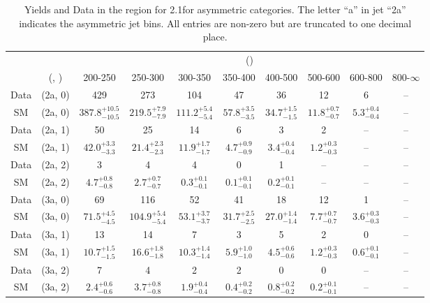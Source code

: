 \begin{table}[h!]
\tiny
\centering
\caption{Yields and Data in the \mmj region for 2.1\ifb for asymmetric categories. The letter ``a'' in jet \eg ``2a''  indicates the asymmetric jet bins. All entries are non-zero but are truncated to one decimal place.\label{tab:yieldsall_mumu_comb_asym}}
\begin{tabular}
{cccccccccc}
	\hline\hline
	&	& \multicolumn{8}{c}{\scalht (\gev)}\\ 
	&	 (\njet, \nb) & 200-250 & 250-300 & 300-350 & 350-400 & 400-500 & 500-600 & 600-800 & 800-$\infty$ \\ [0.8ex] 
\hline
	Data & (2a, 0) & 429 & 273 & 104 & 47 & 36 & 12 & 6 & -- \\[0.5ex] 
	SM & (2a, 0) & $387.8^{+ 10.5 }_{- 10.5 }$ & $219.5^{+ 7.9 }_{- 7.9 }$ & $111.2^{+ 5.4 }_{- 5.4 }$ & $57.8^{+ 3.5 }_{- 3.5 }$ & $34.7^{+ 1.5 }_{- 1.5 }$ & $11.8^{+ 0.7 }_{- 0.7 }$ & $5.3^{+ 0.4 }_{- 0.4 }$ & -- \\[0.5ex] 
	Data & (2a, 1) & 50 & 25 & 14 & 6 & 3 & 2 & -- & -- \\[0.5ex] 
	SM & (2a, 1) & $42.0^{+ 3.3 }_{- 3.3 }$ & $21.4^{+ 2.3 }_{- 2.3 }$ & $11.9^{+ 1.7 }_{- 1.7 }$ & $4.7^{+ 0.9 }_{- 0.9 }$ & $3.4^{+ 0.4 }_{- 0.4 }$ & $1.2^{+ 0.3 }_{- 0.3 }$ & -- & -- \\[0.5ex] 
	Data & (2a, 2) & 3 & 4 & 4 & 0 & 1 & -- & -- & -- \\[0.5ex] 
	SM & (2a, 2) & $4.7^{+ 0.8 }_{- 0.8 }$ & $2.7^{+ 0.7 }_{- 0.7 }$ & $0.3^{+ 0.1 }_{- 0.1 }$ & $0.1^{+ 0.1 }_{- 0.1 }$ & $0.2^{+ 0.1 }_{- 0.1 }$ & -- & -- & -- \\[0.5ex] 
	Data & (3a, 0) & 69 & 116 & 52 & 41 & 18 & 12 & 1 & -- \\[0.5ex] 
	SM & (3a, 0) & $71.5^{+ 4.5 }_{- 4.5 }$ & $104.9^{+ 5.4 }_{- 5.4 }$ & $53.1^{+ 3.7 }_{- 3.7 }$ & $31.7^{+ 2.5 }_{- 2.5 }$ & $27.0^{+ 1.4 }_{- 1.4 }$ & $7.7^{+ 0.7 }_{- 0.7 }$ & $3.6^{+ 0.3 }_{- 0.3 }$ & -- \\[0.5ex] 
	Data & (3a, 1) & 13 & 14 & 7 & 3 & 5 & 2 & 0 & -- \\[0.5ex] 
	SM & (3a, 1) & $10.7^{+ 1.5 }_{- 1.5 }$ & $16.6^{+ 1.8 }_{- 1.8 }$ & $10.3^{+ 1.4 }_{- 1.4 }$ & $5.9^{+ 1.0 }_{- 1.0 }$ & $4.5^{+ 0.6 }_{- 0.6 }$ & $1.2^{+ 0.3 }_{- 0.3 }$ & $0.6^{+ 0.1 }_{- 0.1 }$ & -- \\[0.5ex] 
	Data & (3a, 2) & 7 & 4 & 2 & 2 & 0 & 0 & -- & -- \\[0.5ex] 
	SM & (3a, 2) & $2.4^{+ 0.6 }_{- 0.6 }$ & $3.7^{+ 0.8 }_{- 0.8 }$ & $1.9^{+ 0.4 }_{- 0.4 }$ & $0.4^{+ 0.2 }_{- 0.2 }$ & $0.8^{+ 0.2 }_{- 0.2 }$ & $0.2^{+ 0.1 }_{- 0.1 }$ & -- & -- \\[0.5ex] 

\end{tabular}
\end{table}
